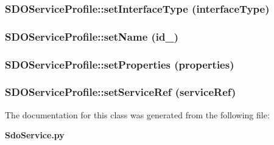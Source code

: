 \subsubsection{\setlength{\rightskip}{0pt plus 5cm}SDOService\-Profile::set\-Interface\-Type (interface\-Type)}\label{classSDOServiceProfile_SDOServiceProfilea3}


\subsubsection{\setlength{\rightskip}{0pt plus 5cm}SDOService\-Profile::set\-Name (id\_\-)}\label{classSDOServiceProfile_SDOServiceProfilea1}


\subsubsection{\setlength{\rightskip}{0pt plus 5cm}SDOService\-Profile::set\-Properties (properties)}\label{classSDOServiceProfile_SDOServiceProfilea7}


\subsubsection{\setlength{\rightskip}{0pt plus 5cm}SDOService\-Profile::set\-Service\-Ref (service\-Ref)}\label{classSDOServiceProfile_SDOServiceProfilea9}




The documentation for this class was generated from the following file:\begin{CompactItemize}
\item 
{\bf Sdo\-Service.py}\end{CompactItemize}
